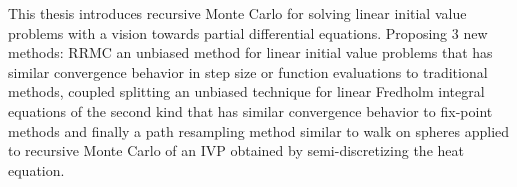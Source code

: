 This thesis introduces recursive Monte Carlo
for solving linear initial value problems with a vision towards
partial differential equations.
Proposing $3$ new methods:
RRMC an unbiased method for linear initial value problems
that has similar convergence behavior in step size or function evaluations to traditional methods,
coupled splitting an unbiased technique for linear Fredholm integral equations of the
second kind that has similar convergence behavior to fix-point methods
and finally a path resampling method similar to walk on spheres applied
to recursive Monte Carlo of an IVP obtained by semi-discretizing the heat equation.